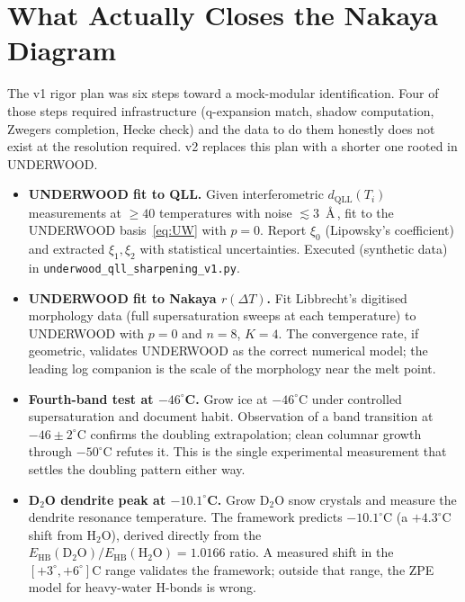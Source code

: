 \documentclass[11pt,letterpaper]{article}
\theoremstyle{plain}
\theoremstyle{definition}
\begin{document}
\section{What Actually Closes the Nakaya Diagram}

The v1 rigor plan was six steps toward a mock-modular
identification.  Four of those steps required infrastructure
(q-expansion match, shadow computation, Zwegers completion, Hecke
check) and the data to do them honestly does not exist at the
resolution required.  v2 replaces this plan with a shorter one
rooted in UNDERWOOD.

\begin{itemize}[leftmargin=2em]
\item[{\bfseries C1}] \textbf{UNDERWOOD fit to QLL.}  Given
  interferometric $d_{\text{QLL}}(T_i)$ measurements at $\ge 40$
  temperatures with noise $\lesssim 3$~\AA\,, fit to the UNDERWOOD
  basis~\eqref{eq:UW} with $p = 0$.  Report $\xi_0$ (Lipowsky's
  coefficient) and extracted $\xi_1, \xi_2$ with statistical
  uncertainties.  Executed (synthetic data) in
  \texttt{underwood\_qll\_sharpening\_v1.py}.
\item[{\bfseries C2}] \textbf{UNDERWOOD fit to Nakaya $r(\Delta T)$.}
  Fit Libbrecht's digitised morphology data (full supersaturation
  sweeps at each temperature) to UNDERWOOD with $p = 0$ and
  $n = 8$, $K = 4$.  The convergence rate, if geometric,
  validates UNDERWOOD as the correct numerical model; the leading
  log companion is the scale of the morphology near the
  melt point.
\item[{\bfseries C3}] \textbf{Fourth-band test at $-46^\circ$C.}
  Grow ice at $-46^\circ$C under controlled supersaturation and
  document habit.  Observation of a band transition at
  $-46 \pm 2^\circ$C confirms the doubling extrapolation; clean
  columnar growth through $-50^\circ$C refutes it.  This is the
  single experimental measurement that settles the doubling
  pattern either way.
\item[{\bfseries C4}] \textbf{D$_2$O dendrite peak at $-10.1^\circ$C.}
  Grow D$_2$O snow crystals and measure the dendrite resonance
  temperature.  The framework predicts $-10.1^\circ$C (a
  $+4.3^\circ$C shift from H$_2$O), derived directly from the
  $E_{\text{HB}}(\text{D}_2\text{O}) / E_{\text{HB}}(\text{H}_2\text{O})
  = 1.0166$ ratio.  A measured shift in the
  $[+3^\circ, +6^\circ]$C range validates the framework; outside
  that range, the ZPE model for heavy-water H-bonds is wrong.
\end{itemize}
\end{document}
